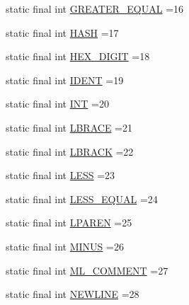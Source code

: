 \begin{DoxyCompactItemize}
static final int \hyperlink{classorg_1_1tzi_1_1use_1_1parser_1_1testsuite_1_1_test_suite_lexer_a4b0a17cc3f14f59fa05b6039c1f355de}{G\-R\-E\-A\-T\-E\-R\-\_\-\-E\-Q\-U\-A\-L} =16
\item 
static final int \hyperlink{classorg_1_1tzi_1_1use_1_1parser_1_1testsuite_1_1_test_suite_lexer_a4c7a0937f7f857583ef9ade599d33b51}{H\-A\-S\-H} =17
\item 
static final int \hyperlink{classorg_1_1tzi_1_1use_1_1parser_1_1testsuite_1_1_test_suite_lexer_a1212e38fd24d0dcb93fba3d0ac1557e5}{H\-E\-X\-\_\-\-D\-I\-G\-I\-T} =18
\item 
static final int \hyperlink{classorg_1_1tzi_1_1use_1_1parser_1_1testsuite_1_1_test_suite_lexer_a75edc06c00b04e5f6c43298b41697e8b}{I\-D\-E\-N\-T} =19
\item 
static final int \hyperlink{classorg_1_1tzi_1_1use_1_1parser_1_1testsuite_1_1_test_suite_lexer_aa05688b2c62ad8dc29fbfcf522342f02}{I\-N\-T} =20
\item 
static final int \hyperlink{classorg_1_1tzi_1_1use_1_1parser_1_1testsuite_1_1_test_suite_lexer_a46c234cd2bc8b47311f0522381e2acbb}{L\-B\-R\-A\-C\-E} =21
\item 
static final int \hyperlink{classorg_1_1tzi_1_1use_1_1parser_1_1testsuite_1_1_test_suite_lexer_a8c668a2eba408bcb3308e8b97e09bb55}{L\-B\-R\-A\-C\-K} =22
\item 
static final int \hyperlink{classorg_1_1tzi_1_1use_1_1parser_1_1testsuite_1_1_test_suite_lexer_a64a908fc910358a455b239f204dacfff}{L\-E\-S\-S} =23
\item 
static final int \hyperlink{classorg_1_1tzi_1_1use_1_1parser_1_1testsuite_1_1_test_suite_lexer_ab4a169d710b1d6e4436eace45d9e0dfd}{L\-E\-S\-S\-\_\-\-E\-Q\-U\-A\-L} =24
\item 
static final int \hyperlink{classorg_1_1tzi_1_1use_1_1parser_1_1testsuite_1_1_test_suite_lexer_a268174db2bdd2ac7ccc6504385ffbda8}{L\-P\-A\-R\-E\-N} =25
\item 
static final int \hyperlink{classorg_1_1tzi_1_1use_1_1parser_1_1testsuite_1_1_test_suite_lexer_a211b48007da078d80bb1d361652e1124}{M\-I\-N\-U\-S} =26
\item 
static final int \hyperlink{classorg_1_1tzi_1_1use_1_1parser_1_1testsuite_1_1_test_suite_lexer_afd323b1f5ea0f3bf332c2c29c9c44ccc}{M\-L\-\_\-\-C\-O\-M\-M\-E\-N\-T} =27
\item 
static final int \hyperlink{classorg_1_1tzi_1_1use_1_1parser_1_1testsuite_1_1_test_suite_lexer_aaf0c3c6d4b2639beeeb110f37e7b85a7}{N\-E\-W\-L\-I\-N\-E} =28
\item 

\end{DoxyCompactItemize}
